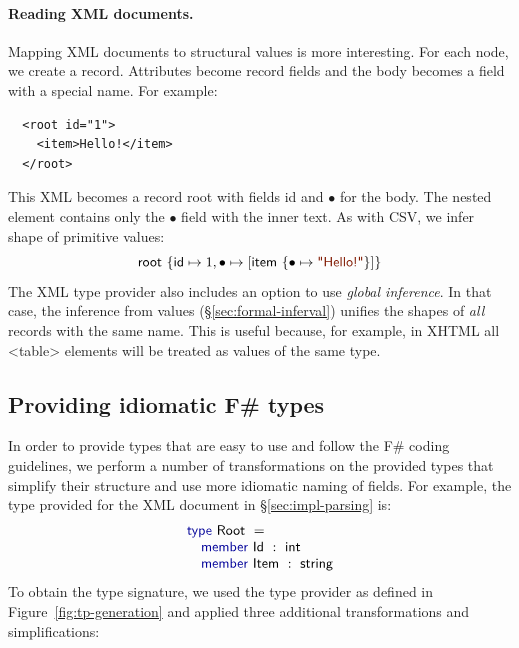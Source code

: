 \documentclass[10pt,nocopyrightspace]{sigplanconf}
\newcommand{\kvd}[1]{\textnormal{\textcolor{kvdclr}{\sffamily #1}}}
\newcommand{\str}[1]{\textnormal{\textcolor{strclr}{\sffamily "#1"}}}
\newcommand{\ident}[1]{\textnormal{\sffamily #1}}
\begin{document}
\paragraph{Reading XML documents.}
Mapping XML documents to structural values is more interesting. For each node, we
create a record. Attributes become record fields and the body becomes a field with a special
name. For example:
%
{\small{
\begin{verbatim}
  <root id="1">
    <item>Hello!</item>
  </root>
\end{verbatim}
}}
%
\noindent
This XML becomes a record \ident{root} with fields \ident{id} and $\bullet$ for the body.
The nested element contains only the $\bullet$ field with the inner text. As with CSV, we
infer shape of primitive values:
%
\begin{equation*}
\ident{root}~\{ \ident{id} \mapsto 1, \bullet \mapsto [ \ident{item}~\{ \bullet \mapsto \str{Hello!} \}] \}
\end{equation*}
%
The XML type provider also includes an option to use \emph{global inference}. In that case,
the inference from values (\S\ref{sec:formal-inferval}) unifies the shapes of \emph{all} records with the
same name. This is useful because, for example, in XHTML all {\small\ttfamily <table>} elements
will be treated as values of the same type.


\subsection{Providing idiomatic F\# types}
\label{sec:impl-naming}

In order to provide types that are easy to use and follow the F\# coding guidelines,
we perform a number of transformations on the provided types that simplify their structure
and use more idiomatic naming of fields. For example, the type provided for the XML document in
\S\ref{sec:impl-parsing} is:
%
\begin{equation*}
\begin{array}{l}
 \kvd{type}~\ident{Root}~=  \\
 \quad \kvd{member}~\ident{Id}~:~\ident{int} \\
 \quad \kvd{member}~\ident{Item}~:~\ident{string}
\end{array}
\end{equation*}
%
To obtain the type signature, we used the type provider as defined in Figure~\ref{fig:tp-generation}
and applied three additional transformations and simplifications:
\end{document}
